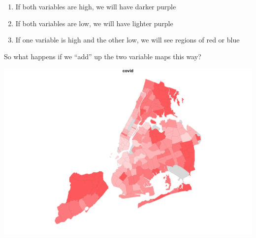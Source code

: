 \documentclass[
  openany]{book}
\newenvironment{Shaded}{\begin{snugshade}}{\end{snugshade}}
\newcommand{\AttributeTok}[1]{\textcolor[rgb]{0.77,0.63,0.00}{#1}}
\newcommand{\DecValTok}[1]{\textcolor[rgb]{0.00,0.00,0.81}{#1}}
\newcommand{\FloatTok}[1]{\textcolor[rgb]{0.00,0.00,0.81}{#1}}
\newcommand{\FunctionTok}[1]{\textcolor[rgb]{0.00,0.00,0.00}{#1}}
\newcommand{\NormalTok}[1]{#1}
\newcommand{\OtherTok}[1]{\textcolor[rgb]{0.56,0.35,0.01}{#1}}
\newcommand{\SpecialCharTok}[1]{\textcolor[rgb]{0.00,0.00,0.00}{#1}}
\newcommand{\StringTok}[1]{\textcolor[rgb]{0.31,0.60,0.02}{#1}}
\providecommand{\tightlist}{%
  \setlength{\itemsep}{0pt}\setlength{\parskip}{0pt}}
\begin{document}
\begin{enumerate}
\def\labelenumi{\arabic{enumi}.}
\tightlist
\item
  If both variables are high, we will have darker purple
\item
  If both variables are low, we will have lighter purple
\item
  If one variable is high and the other low, we will see regions of red or blue
\end{enumerate}

So what happens if we ``add'' up the two variable maps this way?

\begin{Shaded}
\end{Shaded}

\begin{center}\includegraphics[width=0.9\linewidth]{carpedatum_files/figure-html/unnamed-chunk-96-1} \end{center}
\end{document}
